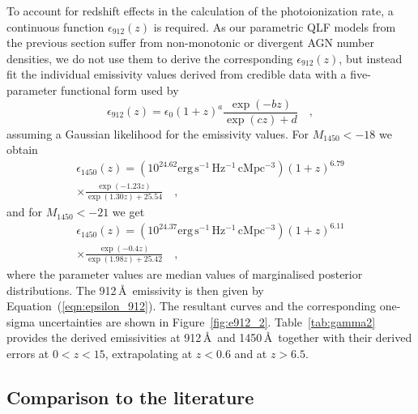 \documentclass[fleqn,usenatbib]{mnras}
\begin{document}
To account for redshift effects in the calculation of the 
photoionization rate, a continuous function
$\epsilon_{912}\left(z\right)$ is required. As our parametric QLF
models from the previous section suffer from non-monotonic or
divergent AGN number densities, we do not use them to derive the
corresponding $\epsilon_{912}\left(z\right)$, but instead fit the
individual emissivity values derived from credible data with a
five-parameter functional form used by \citet{2012ApJ...746..125H}
\begin{equation}
  \epsilon_{912}\left(z\right)=\epsilon_0(1+z)^a\frac{\exp(-bz)}{\exp(cz)+d}\quad,
  \label{eqn:e912fit}
\end{equation}
assuming a Gaussian likelihood for the emissivity values.  For
$M_{1450}<-18$ we obtain
\begin{multline}
  \epsilon_{1450}\left(z\right)=\left(10^{24.62}\mathrm{erg\, s^{-1}\, Hz^{-1}\, cMpc^{-3}}\right)\left(1+z\right)^{6.79}\\\times\frac{\exp(-1.23z)}{\exp(1.30z)+25.54}\quad,
  \label{eqn:e912_18}
\end{multline}
 and for $M_{1450}<-21$ we get
\begin{multline}
  \epsilon_{1450}\left(z\right)=\left(10^{24.37}\mathrm{erg\, s^{-1}\, Hz^{-1}\, cMpc^{-3}}\right)\left(1+z\right)^{6.11}\\\times\frac{\exp(-0.4z)}{\exp(1.98z)+25.42}\quad,
  \label{eqn:e912_21}
\end{multline}
where the parameter values are median values of marginalised posterior
distributions.  The 912\,\AA\ emissivity is then given by
Equation~(\ref{eqn:epsilon_912}).  The resultant curves and the
corresponding one-sigma uncertainties are shown in
Figure~\ref{fig:e912_2}.  Table~\ref{tab:gamma2} provides the derived
emissivities at 912\,\AA\ and 1450\,\AA\ together with their derived
errors at $0<z<15$, extrapolating at $z<0.6$ and at $z>6.5$.

\subsection{Comparison to the literature}
\end{document}
